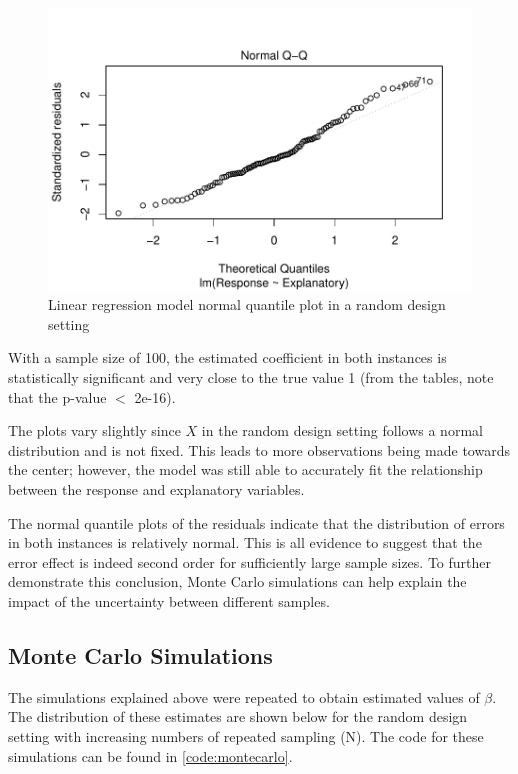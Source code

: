 \documentclass[nohyperref]{article}
\theoremstyle{plain}
\theoremstyle{definition}
\theoremstyle{remark}
\begin{document}
\begin{figure}[!h]
\vskip 0.2in
\begin{center}
\centerline{\includegraphics[width=\columnwidth]{randomQQ.pdf}}
\caption{Linear regression model normal quantile plot in a random design setting}
\label{linRegRandomQQ}
\end{center}
\vskip -0.2in
\end{figure}


With a sample size of 100, the estimated coefficient in both instances is statistically significant and very close to the true value 1 (from the tables, note that the p-value $<$ 2e-16). 

The plots vary slightly since $X$ in the random design setting follows a normal distribution and is not fixed. This leads to more observations being made towards the center; however, the model was still able to accurately fit the relationship between the response and explanatory variables. 

The normal quantile plots of the residuals indicate that the distribution of errors in both instances is relatively normal. This is all evidence to suggest that the error effect is indeed second order for sufficiently large sample sizes. To further demonstrate this conclusion, Monte Carlo simulations can help explain the impact of the uncertainty between different samples.


\subsection{Monte Carlo Simulations}
The simulations explained above were repeated to obtain estimated values of $\beta$. The distribution of these estimates are shown below for the random design setting with increasing numbers of repeated sampling (N). The code for these simulations can be found in \cref{code:montecarlo}.
\end{document}

